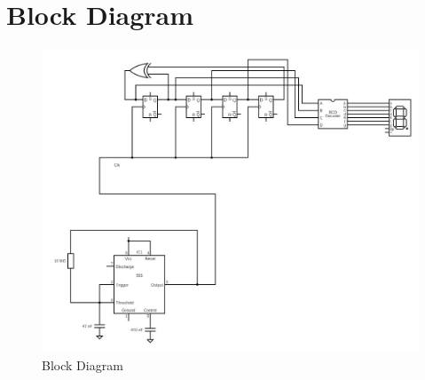 \documentclass{article}
\begin{document}
\section{Block Diagram}
\begin{figure}[ht]
\centering
\includegraphics[width=0.7\linewidth]{Images/BlockDiagram.jpg}
\caption{Block Diagram}
\end{figure}
\FloatBarrier
\end{document}
